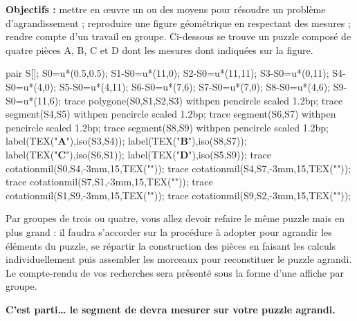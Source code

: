 \begin{activite}
    \begin{changemargin}{-10mm}{-20mm}
    {\bf Objectifs :} mettre en \oe uvre un ou des moyens pour résoudre un problème d'agrandissement ; reproduire une figure géométrique en respectant des mesures ; rendre compte d'un travail en groupe.
        Ci-dessous se trouve un puzzle composé de quatre pièces A, B, C et D dont les mesures dont indiquées sur la figure.
        \begin{center}
            \begin{Geometrie}[CoinHD={(12u,12u)}]
                pair S[];
                S0=u*(0.5,0.5);
                S1-S0=u*(11,0);
                S2-S0=u*(11,11);
                S3-S0=u*(0,11);
                S4-S0=u*(4,0);
                S5-S0=u*(4,11);
                S6-S0=u*(7,6);
                S7-S0=u*(7,0);
                S8-S0=u*(4,6);
                S9-S0=u*(11,6);
                trace polygone(S0,S1,S2,S3) withpen pencircle scaled 1.2bp;
                trace segment(S4,S5) withpen pencircle scaled 1.2bp;
                trace segment(S6,S7) withpen pencircle scaled 1.2bp;
                trace segment(S8,S9) withpen pencircle scaled 1.2bp;
                label(TEX("\textbf{A}"),iso(S3,S4));
                label(TEX("\textbf{B}"),iso(S8,S7));
                label(TEX("\textbf{C}"),iso(S6,S1));
                label(TEX("\textbf{D}"),iso(S5,S9));
                trace cotationmil(S0,S4,-3mm,15,TEX(""));
                trace cotationmil(S4,S7,-3mm,15,TEX(""));
                trace cotationmil(S7,S1,-3mm,15,TEX(""));
                trace cotationmil(S1,S9,-3mm,15,TEX(""));
                trace cotationmil(S9,S2,-3mm,15,TEX(""));
            \end{Geometrie}
            \end{center}
    
        Par groupes de trois ou quatre, vous allez devoir refaire le même puzzle mais en plus grand : il faudra s'accorder sur la procédure à adopter pour agrandir les éléments du puzzle, se répartir la construction des pièces en faisant les calculs individuellement puis assembler les morceaux pour reconstituer le puzzle agrandi. \\
        Le compte-rendu de vos recherches sera présenté sous la forme d’une affiche par groupe. \\
        \begin{center}
            {\bf C'est parti\dots{} le segment de  devra mesurer  sur votre puzzle agrandi.}
        \end{center}
    \end{changemargin}
 \end{activite}